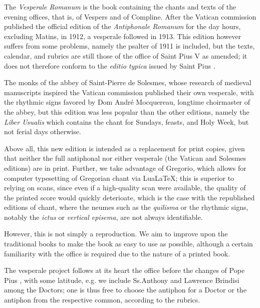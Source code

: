 

\begin{enpars}
The \textit{Vesperale Romanum} is the book containing the chants and texts of the evening offices, that is, of Vespers and of Compline. After the Vatican commission published the official edition of the \textit{Antiphonale Romanum} for the day hours, excluding Matins, in 1912, a vesperale followed in 1913. This edition however suffers from some problems, namely the psalter of 1911 is included, but the texts, calendar, and rubrics are still those of the office of Saint Pius V as amended; it does not therefore conform to the \textit{editio typica} issued by Saint Pius .

The monks of the abbey of Saint-Pierre de Solesmes, whose research of medieval manuscripts inspired the Vatican commission published their own vesperale, with the rhythmic signs favored by Dom André Mocquereau, longtime choirmaster of the abbey, but this edition was less popular than the other editions, namely the \textit{Liber Usualis} which contains the chant for Sundays, feasts, and Holy Week, but not ferial days otherwise.


Above all, this new edition is intended as a replacement for print copies, given that neither the full antiphonal nor either vesperale (the Vatican and Solesmes editions) are in print. Further, we take advantage of Gregorio, which allows for computer typesetting of Gregorian chant via LuaLaTeX; this is superior to relying on scans, since even if a high-quality scan were available, the quality of the printed score would quickly deterioate, which is the case with the republished editions of chant, where the neumes such as the \textit{quilisma} or the rhythmic signs, notably the \textit{ictus} or \textit{vertical episema,} are not always identifiable.

However, this is not simply a reproduction. We aim to improve upon the traditional books to make the book as easy to use as possible, although a certain familiarity with the office is required due to the nature of a printed book.


The vesperale project follows at its heart the office before the changes of Pope Pius , with some latitude, e.g. we include Ss.\@ Anthony and Lawrence Brindisi among the Doctors; one is thus free to choose the antiphon for a Doctor or the antiphon from the respective common, according to the rubrics.


\end{enpars}
